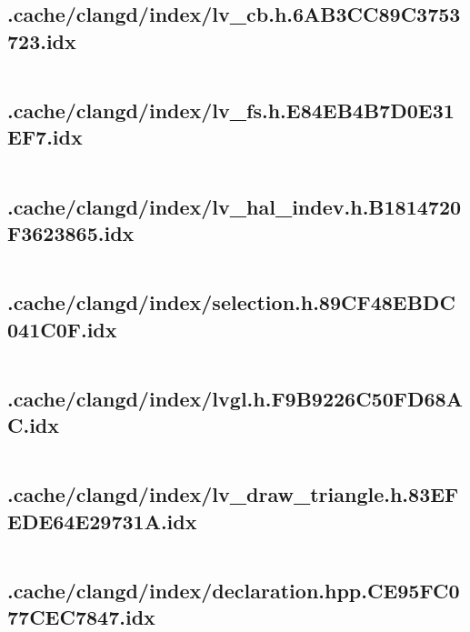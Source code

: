 \subsection{.cache/clangd/index/lv_cb.h.6AB3CC89C3753723.idx}
\inputminted[linenos,tabsize=2,breaklines, breakanywhere]{c}{lv_cb.h.6AB3CC89C3753723.idx}
\pagebreak

\subsection{.cache/clangd/index/lv_fs.h.E84EB4B7D0E31EF7.idx}
\inputminted[linenos,tabsize=2,breaklines, breakanywhere]{c}{lv_fs.h.E84EB4B7D0E31EF7.idx}
\pagebreak

\subsection{.cache/clangd/index/lv_hal_indev.h.B1814720F3623865.idx}
\inputminted[linenos,tabsize=2,breaklines, breakanywhere]{c}{lv_hal_indev.h.B1814720F3623865.idx}
\pagebreak

\subsection{.cache/clangd/index/selection.h.89CF48EBDC041C0F.idx}
\inputminted[linenos,tabsize=2,breaklines, breakanywhere]{c}{selection.h.89CF48EBDC041C0F.idx}
\pagebreak

\subsection{.cache/clangd/index/lvgl.h.F9B9226C50FD68AC.idx}
\inputminted[linenos,tabsize=2,breaklines, breakanywhere]{c}{lvgl.h.F9B9226C50FD68AC.idx}
\pagebreak

\subsection{.cache/clangd/index/lv_draw_triangle.h.83EFEDE64E29731A.idx}
\inputminted[linenos,tabsize=2,breaklines, breakanywhere]{c}{lv_draw_triangle.h.83EFEDE64E29731A.idx}
\pagebreak

\subsection{.cache/clangd/index/declaration.hpp.CE95FC077CEC7847.idx}
\inputminted[linenos,tabsize=2,breaklines, breakanywhere]{c}{declaration.hpp.CE95FC077CEC7847.idx}
\pagebreak

